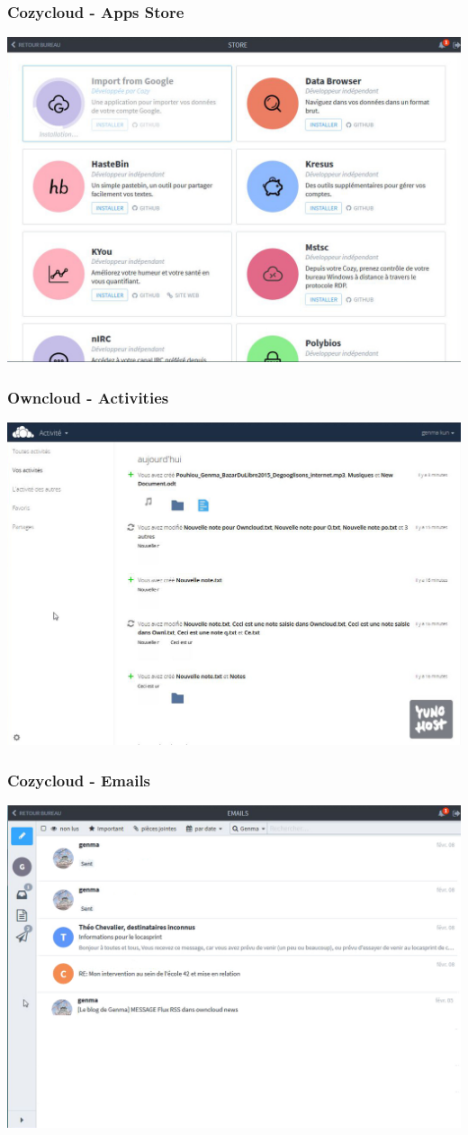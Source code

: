 \documentclass{beamer}
\begin{document}
\begin{frame}
\frametitle{Cozycloud - Apps Store}
\includegraphics[scale=0.3] {./CozyCloud/CozyCloud_Store.jpg}
\end{frame}

\begin{frame}
\frametitle{Owncloud - Activities}
\includegraphics[scale=0.3] {./Owncloud/Owncloud_Activites.jpg}
\end{frame}

\begin{frame}
\frametitle{Cozycloud - Emails}
\includegraphics[scale=0.3] {./CozyCloud/CozyCloud_Emails.jpg}
\end{frame}
\end{document}
